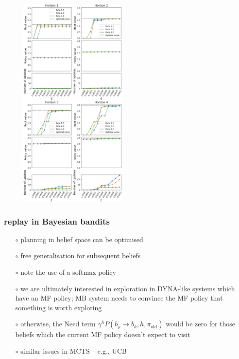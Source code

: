 \documentclass[aspectratio=169]{beamer}
\newcommand{\old}{\text{old}}
\begin{document}
\begin{landscape}
    \begin{frame}
        \begin{figure}
            \includegraphics[width=0.48\textwidth]{trees/2/alpha014_beta010_alpha14_beta13_complete.png}
        \end{figure}
    \end{frame}
\end{landscape}

\begin{frame}
    \frametitle{replay in Bayesian bandits}
    \begin{itemize}
        \item[$\circ$] planning in belief space can be optimised
        \item[$\circ$] free generalisation for subsequent beliefs 
        \item[$\circ$] note the use of a softmax policy
        \item[$\circ$] we are ultimately interested in exploration in DYNA-like systems which have an MF policy; MB system needs to convince the MF policy that something is worth exploring
        \item[$\circ$] otherwise, the Need term $\gamma^h P(b_\rho \rightarrow b_k, h, \pi_\old)$ would be zero for those beliefs which the current MF policy doesn't expect to visit
        \item[$\circ$] similar issues in MCTS -- e.g., UCB  
    \end{itemize}
\end{frame}
\end{document}
